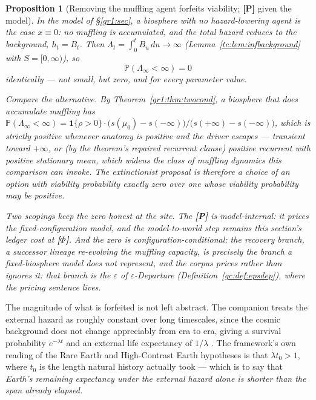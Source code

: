 \documentclass[11pt]{article}
\numberwithin{equation}{section}
\theoremstyle{plain}
\newtheorem{proposition}[theorem]{Proposition}
\theoremstyle{definition}
\theoremstyle{remark}
\newcommand{\PP}{\mathbb{P}}
\newcommand{\one}{\mathbf{1}}
\begin{document}
\begin{proposition}[Removing the muffling agent forfeits viability;
\textbf{[P]} given the model]\label{hr:prop:extinction}
In the model of \S\ref{gr1:sec}, a biosphere with no hazard-lowering
agent is the case $x\equiv0$: no muffling is accumulated, and the total
hazard reduces to the background, $h_t=B_t$. Then
$\Lambda_t=\int_0^t B_u\,du\to\infty$
(Lemma~\ref{tc:lem:infbackground} with $S=[0,\infty)$), so
\[
\PP(\Lambda_\infty<\infty)=0
\]
identically --- not small, but zero, and for every parameter value.

Compare the alternative. By Theorem~\ref{gr1:thm:twocond}, a biosphere
that does accumulate muffling has
$\PP(\Lambda_\infty<\infty)=\one\{\rho>0\}\cdot
\bigl(s(\mu_0)-s(-\infty)\bigr)/\bigl(s(+\infty)-s(-\infty)\bigr)$,
which is strictly positive whenever anatomy is positive and the driver
escapes --- transient toward $+\infty$, or (by the theorem's repaired
recurrent clause) positive recurrent with positive stationary mean,
which \emph{widens} the class of muffling dynamics this comparison can
invoke. The extinctionist proposal is therefore a choice of an option
with viability probability exactly zero over one whose viability
probability may be positive.

Two scopings keep the zero honest at the site. The \textbf{[P]} is
model-internal: it prices the fixed-configuration model, and the
model-to-world step remains this section's ledger cost at
\textbf{[$\Phi$]}. And the zero is configuration-conditional: the
recovery branch, a successor lineage re-evolving the muffling
capacity, is precisely the branch a fixed-biosphere model does not
represent, and the corpus prices rather than ignores it: that branch
is the $\varepsilon$ of $\varepsilon$-Departure
(Definition~\ref{gc:def:epsdep}), where the pricing sentence lives.
\end{proposition}

The magnitude of what is forfeited is not left abstract. The companion
treats the external hazard as roughly constant over long timescales,
since the cosmic background does not change appreciably from era to era,
giving a survival probability $e^{-\lambda t}$ and an external life
expectancy of $1/\lambda$ \cite{Nexus}. The framework's own reading of
the Rare Earth and High-Contrast Earth hypotheses is that
$\lambda t_0>1$, where $t_0$ is the length natural history actually
took --- which is to say that \emph{Earth's remaining expectancy under
the external hazard alone is shorter than the span already elapsed.}
\end{document}
